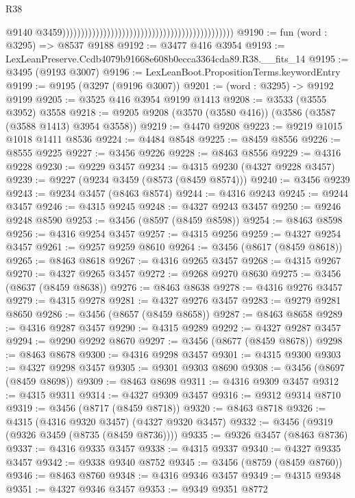 \begin{lexlean}{R38}
\begin{coremodule}
                                                                                                @9140
                                                                                                @3459))))))))))))))))))))))))))))))))))))))))))))))
@9190 := fun (word : @3295) => @8537 @9188
@9192 := @3477 @416 @3954
@9193 := LexLeanPreserve.Ccdb4079b91668e608b0ecca3364cda89.R38.__fits_14
@9195 := @3495 (@9193 @3007)
@9196 := LexLeanBoot.PropositionTerms.keywordEntry
@9199 := @9195 (@3297 (@9196 @3007))
@9201 := (word : @3295) -> @9192 @9199
@9205 := @3525 @416 @3954 @9199 @1413
@9208 := @3533 (@3555 @3952) @3558
@9218 := @9205 @9208 (@3570 (@3580 @416)) (@3586 (@3587 (@3588 @1413) @3954 @3558))
@9219 := @4470 @9208
@9223 := @9219 @1015 @1018 @1411 @8536
@9224 := @4484 @8548
@9225 := @8459 @8556
@9226 := @8555 @9225
@9227 := @3456 @9226
@9228 := @8463 @8556
@9229 := @4316 @9228
@9230 := @9229 @3457
@9234 := @4315 @9230 (@4327 @9228 @3457)
@9239 := @9227 (@9234 @3459 (@8573 (@8459 @8574)))
@9240 := @3456 @9239
@9243 := @9234 @3457 (@8463 @8574)
@9244 := @4316 @9243
@9245 := @9244 @3457
@9246 := @4315 @9245
@9248 := @4327 @9243 @3457
@9250 := @9246 @9248 @8590
@9253 := @3456 (@8597 (@8459 @8598))
@9254 := @8463 @8598
@9256 := @4316 @9254 @3457
@9257 := @4315 @9256
@9259 := @4327 @9254 @3457
@9261 := @9257 @9259 @8610
@9264 := @3456 (@8617 (@8459 @8618))
@9265 := @8463 @8618
@9267 := @4316 @9265 @3457
@9268 := @4315 @9267
@9270 := @4327 @9265 @3457
@9272 := @9268 @9270 @8630
@9275 := @3456 (@8637 (@8459 @8638))
@9276 := @8463 @8638
@9278 := @4316 @9276 @3457
@9279 := @4315 @9278
@9281 := @4327 @9276 @3457
@9283 := @9279 @9281 @8650
@9286 := @3456 (@8657 (@8459 @8658))
@9287 := @8463 @8658
@9289 := @4316 @9287 @3457
@9290 := @4315 @9289
@9292 := @4327 @9287 @3457
@9294 := @9290 @9292 @8670
@9297 := @3456 (@8677 (@8459 @8678))
@9298 := @8463 @8678
@9300 := @4316 @9298 @3457
@9301 := @4315 @9300
@9303 := @4327 @9298 @3457
@9305 := @9301 @9303 @8690
@9308 := @3456 (@8697 (@8459 @8698))
@9309 := @8463 @8698
@9311 := @4316 @9309 @3457
@9312 := @4315 @9311
@9314 := @4327 @9309 @3457
@9316 := @9312 @9314 @8710
@9319 := @3456 (@8717 (@8459 @8718))
@9320 := @8463 @8718
@9326 := @4315 (@4316 @9320 @3457) (@4327 @9320 @3457)
@9332 := @3456 (@9319 (@9326 @3459 (@8735 (@8459 @8736))))
@9335 := @9326 @3457 (@8463 @8736)
@9337 := @4316 @9335 @3457
@9338 := @4315 @9337
@9340 := @4327 @9335 @3457
@9342 := @9338 @9340 @8752
@9345 := @3456 (@8759 (@8459 @8760))
@9346 := @8463 @8760
@9348 := @4316 @9346 @3457
@9349 := @4315 @9348
@9351 := @4327 @9346 @3457
@9353 := @9349 @9351 @8772

\end{coremodule}
\end{lexlean}
